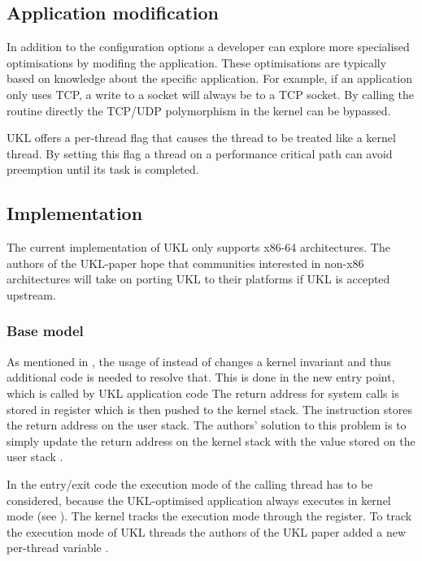 \documentclass[10pt,twocolumn,a4paper]{article}
\begin{document}
  \subsection{Application modification}\label{sec:application-modification}
    In addition to the configuration options a developer can explore more specialised optimisations
    by modifing the application.
    These optimisations are typically based on knowledge about the specific application.
    For example, if an application only uses TCP, a write to a socket will always be to
    a TCP socket.
    By calling the  routine directly the TCP/UDP polymorphism in the kernel
    can be bypassed.
    
    UKL offers a per-thread flag that causes the thread to be treated like a kernel thread.
    By setting this flag a thread on a performance critical path can avoid preemption
    until its task is completed.

  \subsection{Implementation}
    The current implementation of UKL only supports x86-64 architectures.
    The authors of the UKL-paper hope that communities interested in non-x86 architectures
    will take on porting UKL to their platforms if UKL is accepted upstream.

    \subsubsection{Base model}
      As mentioned in , the usage of  instead of 
      changes a kernel invariant and thus additional code is needed to resolve that.
      This is done in the new  entry point, which is called by
      UKL application code
      The return address for system calls is stored in  register which is then 
      pushed to the kernel stack.
      The  instruction stores the return address on the user stack.
      The authors' solution to this problem is to simply update the return address on the kernel
      stack with the value stored on the user stack \cite{ukl-github-entry}.

      In the entry/exit code the execution mode of the calling thread has to be considered,
      because the UKL-optimised application always executes in kernel mode (see ).
      The kernel tracks the execution mode through the  register.
      To track the execution mode of UKL threads the authors of the UKL paper added a 
      new per-thread variable  \cite{ukl-github-entry}.
\end{document}

